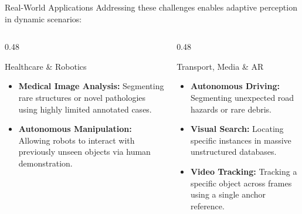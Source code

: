 \documentclass[aspectratio=169, 10pt]{beamer}
\begin{document}
\begin{frame}{Real-World Applications}
    Addressing these challenges enables adaptive perception in dynamic scenarios:
    
    \begin{columns}[T]
        \begin{column}{0.48\textwidth}
            \begin{block}{Healthcare \& Robotics}
                \begin{itemize}
                    \item \textbf{Medical Image Analysis:} Segmenting rare structures or novel pathologies using highly limited annotated cases.
                    \item \textbf{Autonomous Manipulation:} Allowing robots to interact with previously unseen objects via human demonstration.
                \end{itemize}
            \end{block}
        \end{column}
        
        \begin{column}{0.48\textwidth}
            \begin{block}{Transport, Media \& AR}
                \begin{itemize}
                    \item \textbf{Autonomous Driving:} Segmenting unexpected road hazards or rare debris.
                    \item \textbf{Visual Search:} Locating specific instances in massive unstructured databases.
                    \item \textbf{Video Tracking:} Tracking a specific object across frames using a single anchor reference.
                \end{itemize}
            \end{block}
        \end{column}
    \end{columns}
\end{frame}
\end{document}
